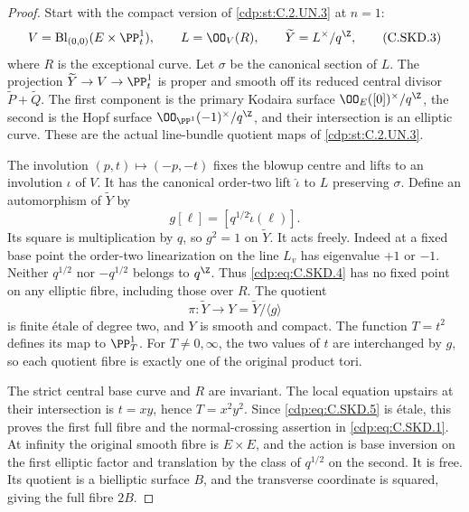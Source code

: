 \begin{proof}
Start with the compact version of \ref{cdp:st:C.2.UN.3} at $n=1$:
\[
 V=\operatorname{Bl}_{(0,0)}(E\times\PP^1_t),\qquad
 L=\OO_V(R),\qquad
 \widetilde Y=L^\times/q^{\Z},
                                                            \tag{C.SKD.3}\label{cdp:eq:C.SKD.3}
\]
where $R$ is the exceptional curve. Let $\sigma$ be
the canonical section of $L$. The projection
$\widetilde Y\to V\to\PP^1_t$ is proper and smooth
off its reduced central divisor
$\widetilde P+\widetilde Q$. The first component is
the primary Kodaira surface
$\OO_E([0])^\times/q^{\Z}$, the second is the Hopf
surface $\OO_{\PP^1}(-1)^\times/q^{\Z}$, and their
intersection is an elliptic curve. These are the
actual line-bundle quotient maps of \ref{cdp:st:C.2.UN.3}.

The involution $(p,t)\mapsto(-p,-t)$ fixes the blowup
centre and lifts to an involution $\iota$ of $V$.
It has the canonical order-two lift $\widehat\iota$
to $L$ preserving $\sigma$. Define an automorphism
of $\widetilde Y$ by
\[
             g[\ell]=[q^{1/2}\widehat\iota(\ell)].
                                                            \tag{C.SKD.4}\label{cdp:eq:C.SKD.4}
\]
Its square is multiplication by $q$, so $g^2=1$
on $\widetilde Y$. It acts freely. Indeed at a
fixed base point the order-two linearization on
the line $L_v$ has eigenvalue $+1$ or $-1$.
Neither $q^{1/2}$ nor $-q^{1/2}$ belongs to
$q^{\Z}$. Thus \eqref{cdp:eq:C.SKD.4} has no fixed point on
any elliptic fibre, including those over $R$.
The quotient
\[
              \pi:\widetilde Y\longrightarrow Y
                        =\widetilde Y/\langle g\rangle
                                                            \tag{C.SKD.5}\label{cdp:eq:C.SKD.5}
\]
is finite \'etale of degree two, and $Y$ is smooth
and compact. The function $T=t^2$ defines its map
to $\PP^1_T$. For $T\ne0,\infty$, the two values
of $t$ are interchanged by $g$, so each quotient
fibre is exactly one of the original product
tori.

The strict central base curve and $R$ are
invariant. The local equation upstairs at their
intersection is $t=xy$, hence $T=x^2y^2$.
Since \eqref{cdp:eq:C.SKD.5} is \'etale, this proves the first
full fibre and the normal-crossing assertion
in \eqref{cdp:eq:C.SKD.1}. At infinity the original smooth
fibre is $E\times E$, and the action is base
inversion on the first elliptic factor and
translation by the class of $q^{1/2}$ on the
second. It is free. Its quotient is a
bielliptic surface $B$, and the transverse
coordinate is squared, giving the full fibre
$2B$.


\end{proof}
